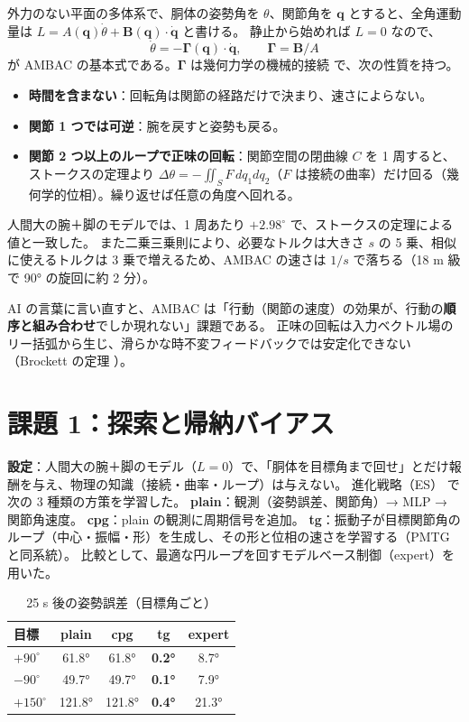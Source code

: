 \documentclass[paper=a4paper,fontsize=10pt,twocolumn,column_gap=2zw,line_length=24zw,number_of_lines=46,head_space=20mm]{jlreq}
\begin{document}
外力のない平面の多体系で、胴体の姿勢角を $\theta$、関節角を $\bm q$ とすると、全角運動量は $L = A(\bm q)\dot\theta + \bm B(\bm q)\cdot\dot{\bm q}$ と書ける。
静止から始めれば $L=0$ なので、
\begin{equation}
\dot\theta = -\bm\Gamma(\bm q)\cdot\dot{\bm q},\qquad \bm\Gamma = \bm B/A
\label{eq:ambac}
\end{equation}
が AMBAC の基本式である。$\bm\Gamma$ は幾何力学の機械的接続 \cite{marsden1992} で、次の性質を持つ。
\begin{itemize}\setlength{\itemsep}{0pt}
\item \textbf{時間を含まない}：回転角は関節の経路だけで決まり、速さによらない。
\item \textbf{関節 1 つでは可逆}：腕を戻すと姿勢も戻る。
\item \textbf{関節 2 つ以上のループで正味の回転}：関節空間の閉曲線 $C$ を 1 周すると、ストークスの定理より
$\Delta\theta = -\iint_S F\,dq_1dq_2$（$F$ は接続の曲率）だけ回る（幾何学的位相）。繰り返せば任意の角度へ回れる。
\end{itemize}
人間大の腕＋脚のモデルでは、1 周あたり $+2.98^\circ$ で、ストークスの定理による値と一致した。
また二乗三乗則により、必要なトルクは大きさ $s$ の 5 乗、相似に使えるトルクは 3 乗で増えるため、AMBAC の速さは $1/s$ で落ちる（18 m 級で 90° の旋回に約 2 分）。

AI の言葉に言い直すと、AMBAC は「行動（関節の速度）の効果が、行動の\textbf{順序と組み合わせ}でしか現れない」課題である。
正味の回転は入力ベクトル場のリー括弧から生じ、滑らかな時不変フィードバックでは安定化できない（Brockett の定理 \cite{brockett1983}）。

\section{課題 1：探索と帰納バイアス}

\textbf{設定}：人間大の腕＋脚のモデル（$L=0$）で、「胴体を目標角まで回せ」とだけ報酬を与え、物理の知識（接続・曲率・ループ）は与えない。
進化戦略（ES）\cite{salimans2017} で次の 3 種類の方策を学習した。
\textbf{plain}：観測（姿勢誤差、関節角）→ MLP → 関節角速度。
\textbf{cpg}：plain の観測に周期信号を追加。
\textbf{tg}：振動子が目標関節角のループ（中心・振幅・形）を生成し、その形と位相の速さを学習する（PMTG \cite{iscen2018} と同系統）。
比較として、最適な円ループを回すモデルベース制御（expert）を用いた。

\begin{table}[t]\centering\small
\caption{25 s 後の姿勢誤差（目標角ごと）}\label{tab:learn}
\begin{tabular}{lcccc}\toprule
目標 & plain & cpg & \textbf{tg} & expert \\\midrule
$+90^\circ$ & 61.8° & 61.8° & \textbf{0.2°} & 8.7° \\
$-90^\circ$ & 49.7° & 49.7° & \textbf{0.1°} & 7.9° \\
$+150^\circ$ & 121.8° & 121.8° & \textbf{0.4°} & 21.3° \\\bottomrule
\end{tabular}
\end{table}
\end{document}

